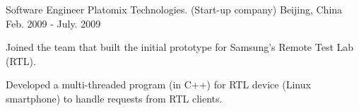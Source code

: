 \begin{cventries}

  \cventry
    {Software Engineer} %
    {Platomix Technologies. (Start-up company)} %
    {Beijing, China} %
    {Feb. 2009 - July. 2009} %
    {
      \begin{cvitems} %
       \item {Joined the team that built the initial prototype for
    Samsung's Remote Test Lab (RTL).}
       \item {Developed a multi-threaded program (in C++) for RTL
    device (Linux smartphone) to handle requests from RTL clients.}
      \end{cvitems}
    }


\end{cventries}
